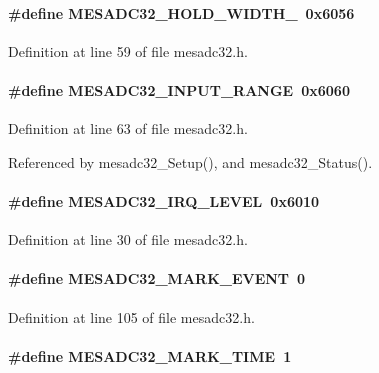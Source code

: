 \paragraph[{MESADC32\_\-HOLD\_\-WIDTH\_\-1}]{\setlength{\rightskip}{0pt plus 5cm}\#define MESADC32\_\-HOLD\_\-WIDTH\_~0x6056}\hfill\label{mesadc32_8h_a214e6ae26d87a30db7dd570368384265}


Definition at line 59 of file mesadc32.h.
\paragraph[{MESADC32\_\-INPUT\_\-RANGE}]{\setlength{\rightskip}{0pt plus 5cm}\#define MESADC32\_\-INPUT\_\-RANGE~0x6060}\hfill\label{mesadc32_8h_aa83419988a8ab19b0d4b12237947ede6}


Definition at line 63 of file mesadc32.h.

Referenced by mesadc32\_\-Setup(), and mesadc32\_\-Status().
\paragraph[{MESADC32\_\-IRQ\_\-LEVEL}]{\setlength{\rightskip}{0pt plus 5cm}\#define MESADC32\_\-IRQ\_\-LEVEL~0x6010}\hfill\label{mesadc32_8h_ad7fe2bcca33f44c6d1bd07ed20ded638}


Definition at line 30 of file mesadc32.h.
\paragraph[{MESADC32\_\-MARK\_\-EVENT}]{\setlength{\rightskip}{0pt plus 5cm}\#define MESADC32\_\-MARK\_\-EVENT~0}\hfill\label{mesadc32_8h_a8bda720ab776e9888641044c30563195}


Definition at line 105 of file mesadc32.h.
\paragraph[{MESADC32\_\-MARK\_\-TIME}]{\setlength{\rightskip}{0pt plus 5cm}\#define MESADC32\_\-MARK\_\-TIME~1}\hfill\label{mesadc32_8h_ac4ae0fb55632d0d03e34d3f9be740449}


